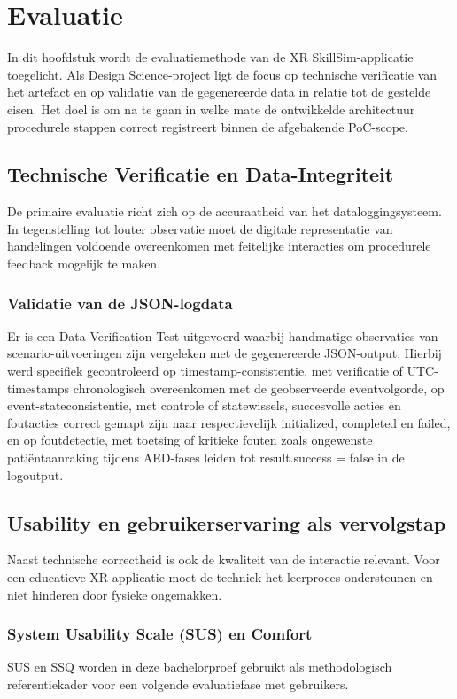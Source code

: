 \chapter{Evaluatie}
\label{ch:evaluatie}

In dit hoofdstuk wordt de evaluatiemethode van de XR SkillSim-applicatie toegelicht. Als Design Science-project ligt de focus op technische verificatie van het artefact en op validatie van de gegenereerde data in relatie tot de gestelde eisen. Het doel is om na te gaan in welke mate de ontwikkelde architectuur procedurele stappen correct registreert binnen de afgebakende PoC-scope.

\section{Technische Verificatie en Data-Integriteit}

De primaire evaluatie richt zich op de accuraatheid van het dataloggingsysteem. In tegenstelling tot louter observatie moet de digitale representatie van handelingen voldoende overeenkomen met feitelijke interacties om procedurele feedback mogelijk te maken.

\subsection{Validatie van de JSON-logdata}
Er is een Data Verification Test uitgevoerd waarbij handmatige observaties van scenario-uitvoeringen zijn vergeleken met de gegenereerde JSON-output. Hierbij werd specifiek gecontroleerd op timestamp-consistentie, met verificatie of UTC-timestamps chronologisch overeenkomen met de geobserveerde eventvolgorde, op event-stateconsistentie, met controle of statewissels, succesvolle acties en foutacties correct gemapt zijn naar respectievelijk initialized, completed en failed, en op foutdetectie, met toetsing of kritieke fouten zoals ongewenste patiëntaanraking tijdens AED-fases leiden tot result.success = false in de logoutput.

\section{Usability en gebruikerservaring als vervolgstap}
Naast technische correctheid is ook de kwaliteit van de interactie relevant. Voor een educatieve XR-applicatie moet de techniek het leerproces ondersteunen en niet hinderen door fysieke ongemakken.

\subsection{System Usability Scale (SUS) en Comfort}
SUS en SSQ worden in deze bachelorproef gebruikt als methodologisch referentiekader voor een volgende evaluatiefase met gebruikers.

